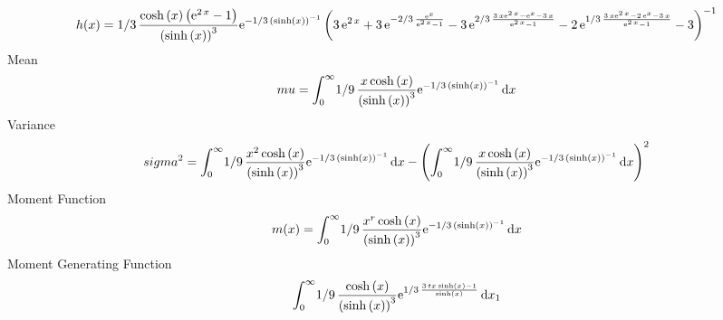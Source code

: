 \documentclass[12pt]{article}
\begin{document}
 $$ h(x)=1/3\,{\frac {\cosh \left( x \right)  \left( {{\rm e}^{2\,x}}-1
 \right) }{ \left( \sinh \left( x \right)  \right) ^{3}}{{\rm e}^{-1/3
\, \left( \sinh \left( x \right)  \right) ^{-1}}} \left( 3\,{{\rm e}^{
2\,x}}+3\,{{\rm e}^{-2/3\,{\frac {{{\rm e}^{x}}}{{{\rm e}^{2\,x}}-1}}}
}-3\,{{\rm e}^{2/3\,{\frac {3\,x{{\rm e}^{2\,x}}-{{\rm e}^{x}}-3\,x}{{
{\rm e}^{2\,x}}-1}}}}-2\,{{\rm e}^{1/3\,{\frac {3\,x{{\rm e}^{2\,x}}-2
\,{{\rm e}^{x}}-3\,x}{{{\rm e}^{2\,x}}-1}}}}-3 \right) ^{-1}}
$$Mean 
 $$ mu=\int_{0}^{\infty }\!1/9\,{\frac {x\cosh \left( x \right) }{ \left( 
\sinh \left( x \right)  \right) ^{3}}{{\rm e}^{-1/3\, \left( \sinh
 \left( x \right)  \right) ^{-1}}}}\,{\rm d}x
$$ Variance 
 $$ sigma^2 = \int_{0}^{\infty }\!1/9\,{\frac {{x}^{2}\cosh \left( x \right) }{
 \left( \sinh \left( x \right)  \right) ^{3}}{{\rm e}^{-1/3\, \left( 
\sinh \left( x \right)  \right) ^{-1}}}}\,{\rm d}x- \left( \int_{0}^{
\infty }\!1/9\,{\frac {x\cosh \left( x \right) }{ \left( \sinh \left( 
x \right)  \right) ^{3}}{{\rm e}^{-1/3\, \left( \sinh \left( x
 \right)  \right) ^{-1}}}}\,{\rm d}x \right) ^{2}
$$Moment Function 
 $$ m(x) = \int_{0}^{\infty }\!1/9\,{\frac {{x}^{r}\cosh \left( x \right) }{
 \left( \sinh \left( x \right)  \right) ^{3}}{{\rm e}^{-1/3\, \left( 
\sinh \left( x \right)  \right) ^{-1}}}}\,{\rm d}x
$$ Moment Generating Function 
 $$\int_{0}^{\infty }\!1/9\,{\frac {\cosh \left( x \right) }{ \left( 
\sinh \left( x \right)  \right) ^{3}}{{\rm e}^{1/3\,{\frac {3\,tx\sinh
 \left( x \right) -1}{\sinh \left( x \right) }}}}}\,{\rm d}x_{{1}}
$$
\end{document}

